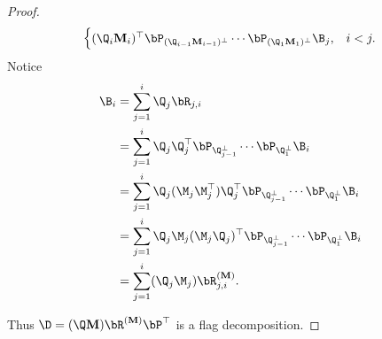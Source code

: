 \begin{proof}
\begin{equation}
\begin{cases}
            (\Q_i\mathbf{M}_i)^\top\bP_{(\Q_{i-1}\mathbf{M}_{i-1})^\perp}\cdots \bP_{(\Q_1\mathbf{M}_1)^\perp} \B_j, &i < j.
        \end{cases}        
    \end{equation}
    Notice 
    \begin{align}
        \B_i &= \sum_{j=1}^i \Q_j \bR_{j,i}\\
             &= \sum_{j=1}^i \Q_j \Q_j^\top \bP_{\Q_{j-1}^\perp}\cdots \bP_{\Q_1^\perp} \B_i\\
             &= \sum_{j=1}^i \Q_j (\M_j \M_j^\top) \Q_j^\top \bP_{\Q_{j-1}^\perp}\cdots \bP_{\Q_1^\perp} \B_i\\
             &= \sum_{j=1}^i \Q_j \M_j (\M_j \Q_j)^\top \bP_{\Q_{j-1}^\perp}\cdots \bP_{\Q_1^\perp} \B_i\\
             &= \sum_{j=1}^i (\Q_j \M_j)\bR^{(\mathbf{M})}_{j,i}.
    \end{align}

    Thus $\D = (\Q\mathbf{M})\bR^{(\mathbf{M})} \bP^\top$ is a flag decomposition.
\end{proof}
